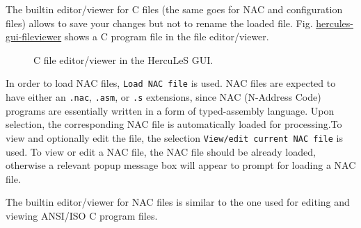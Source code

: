 \documentclass[a4paper]{article}
\begin{document}
The builtin editor/viewer for C files (the same goes for NAC and configuration files) allows to save your changes but not to rename the loaded file. Fig. \hyperref[hercules-gui-fileviewer]{hercules-gui-fileviewer} shows a C program file in the file editor/viewer.
\begin{figure}
\label{hercules-gui-fileviewer}
\noindent{}
\caption{C file editor/viewer in the HercuLeS GUI.}
\end{figure}

In order to load NAC files, \texttt{Load NAC file} is used. NAC files are expected to have either an \texttt{.nac}, \texttt{.asm}, or \texttt{.s} extensions, since NAC (N-Address Code) programs are essentially written in a form of typed-assembly language. Upon selection, the corresponding NAC file is automatically loaded for processing.To view and optionally edit the file, the selection \texttt{View/edit current NAC file} is used. To view or edit a NAC file, the NAC file should be already loaded, otherwise a relevant popup message box will appear to prompt for loading a NAC file.

The builtin editor/viewer for NAC files is similar to the one used for editing and viewing ANSI/ISO C program files.
\end{document}
